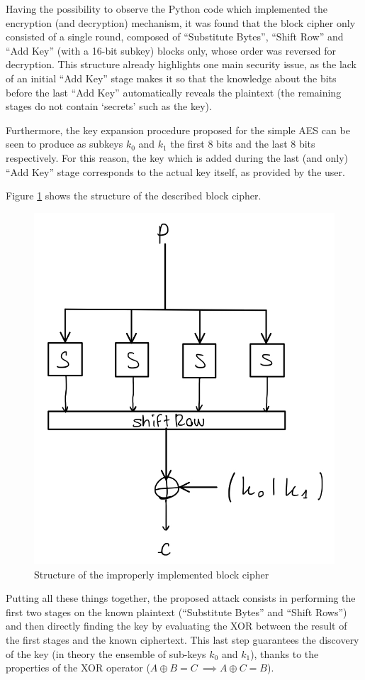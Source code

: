 \documentclass[12pt]{article}
\begin{document}
Having the possibility to observe the Python code which implemented the encryption (and decryption) mechanism, it was found that the block cipher only consisted of a single round, composed of ``Substitute Bytes'', ``Shift Row'' and ``Add Key'' (with a 16-bit subkey) blocks only, whose order was reversed for decryption.
This structure already highlights one main security issue, as the lack of an initial ``Add Key'' stage makes it so that the knowledge about the bits before the last ``Add Key'' automatically reveals the plaintext (the remaining stages do not contain `secrets' such as the key).

Furthermore, the key expansion procedure proposed for the simple AES can be seen to produce as subkeys $k_0$ and $k_1$ the first 8 bits and the last 8 bits respectively. For this reason, the key which is added during the last (and only) ``Add Key'' stage corresponds to the actual key itself, as provided by the user.

Figure \ref{fig:3.1} shows the structure of the described block cipher.

\begin{figure} [ht]
   \centering
   \includegraphics[width = .5\linewidth]{improper_block_scheme.jpeg}
   \caption{Structure of the improperly implemented block cipher}
   \label{fig:3.1}
\end{figure}

Putting all these things together, the proposed attack consists in performing the first two stages on the known plaintext (``Substitute Bytes'' and ``Shift Rows'') and then directly finding the key by evaluating the XOR between the result of the first stages and the known ciphertext. This last step guarantees the discovery of the key (in theory the ensemble of sub-keys $k_0$ and $k_1$), thanks to the properties of the XOR operator ($A\oplus B = C\ \implies A\oplus C = B$).
\end{document}
